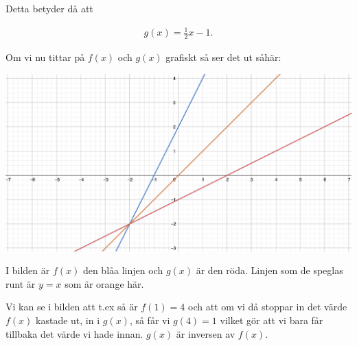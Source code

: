 Detta betyder då att

\begin{align}
	g(x) = \frac{1}{2}x-1.
\end{align}

Om vi nu tittar på $f(x)$ och $g(x)$ grafiskt så ser det ut såhär:

\includegraphics[width=\textwidth]{img/5.png}

I bilden är $f(x)$ den blåa linjen och $g(x)$ är den röda. Linjen som de speglas runt är $y=x$ som är orange här.

Vi kan se i bilden att t.ex så är $f(1)=4$ och att om vi då stoppar in det värde $f(x)$ kastade ut, in i $g(x)$, så får vi $g(4)=1$ vilket gör att vi bara får tillbaka det värde vi hade innan. $g(x)$ är inversen av $f(x)$.






















































